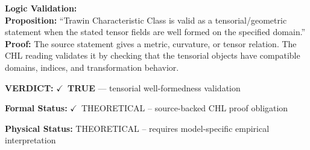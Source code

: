 \textbf{Logic Validation:}\\
\textbf{Proposition:} ``Trawin Characteristic Class is valid as a tensorial/geometric statement when the stated
tensor fields are well formed on the specified domain.''\\
\textbf{Proof:} The source statement gives a metric, curvature, or tensor relation. The CHL reading
validates it by checking that the tensorial objects have compatible domains, indices,
and transformation behavior.

\textbf{VERDICT:} \ensuremath{\checkmark}\ \textbf{TRUE} --- tensorial well-formedness validation

\textbf{Formal Status:} \ensuremath{\checkmark}\ THEORETICAL -- source-backed CHL proof obligation

\textbf{Physical Status:} THEORETICAL -- requires model-specific empirical interpretation
\par\vspace{0.45em}
\par
\ifTZPDarkEdition
{}
\fi
\endgroup
\endgroup
